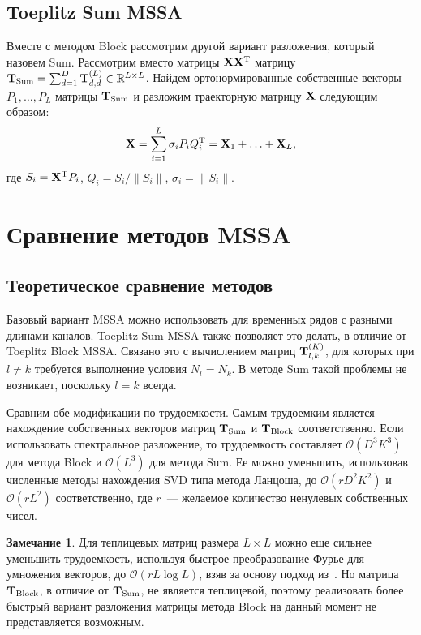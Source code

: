 \documentclass[specialist,
substylefile = spbu_report.rtx,
subf,href,colorlinks=true, 12pt]{disser}
\theoremstyle{definition}
\newtheorem{remark}{Замечание}
\newcommand{\R}{\mathbb{R}}
\begin{document}
\subsection{Toeplitz Sum MSSA}\label{sect:sum}
Вместе с методом Block рассмотрим другой вариант разложения, который назовем Sum. Рассмотрим вместо матрицы $\mathbf{X}\mathbf{X}^{\mathrm{T}}$ матрицу $\bfT_{\text{Sum}}=\sum_{d=1}^D \bfT_{d,d}^{(L)}\in\R^{L\times L}$. Найдем ортонормированные собственные векторы $P_1,\ldots,P_L$ матрицы $\mathbf{T}_{\text{Sum}}$ и разложим траекторную матрицу $\mathbf{X}$ следующим образом:
\begin{equation}\label{eq:sum_decomposition}
	\mathbf{X}=\sum_{i=1}^L\sigma_i P_iQ_i^{\mathrm{T}}=\mathbf{X}_1+\ldots+\mathbf{X}_L,
\end{equation}
где $S_i=\mathbf{X}^{\mathrm{T}} P_i$, $Q_i=S_i/\|S_i\|$, $\sigma_i=\|S_i\|$.

\section{Сравнение методов MSSA}\label{sect:mssa_comparison}
\subsection{Теоретическое сравнение методов}
Базовый вариант MSSA можно использовать для временных рядов с разными длинами каналов. Toeplitz Sum MSSA также позволяет это делать, в отличие от Toeplitz Block MSSA. Связано это с вычислением матриц $\mathbf{T}_{l,k}^{(K)}$, для которых при $l\ne k$ требуется выполнение условия $N_l=N_k$. В методе Sum такой проблемы не возникает, поскольку $l=k$ всегда.

Сравним обе модификации по трудоемкости. Самым трудоемким является нахождение собственных векторов матриц $\mathbf{T}_{\text{Sum}}$ и $\mathbf{T}_{\text{Block}}$ соответственно. Если использовать спектральное разложение, то трудоемкость составляет $\mathcal{O}(D^3K^3)$ для метода Block и $\mathcal{O}(L^3)$ для метода Sum. Ее можно уменьшить, использовав численные методы нахождения SVD типа метода Ланцоша, до $\mathcal{O}(rD^2K^2)$ и $\mathcal{O}(rL^2)$ соответственно, где $r$~--- желаемое количество ненулевых собственных чисел.
\begin{remark}\label{remark:mssa_complexity}
	Для теплицевых матриц размера $L\times L$ можно еще сильнее уменьшить трудоемкость, используя быстрое преобразование Фурье для умножения векторов, до $\mathcal{O}(r L\log L)$, взяв за основу подход из~\cite{Korobeynikov2010,Golyandina2015}. Но матрица $\mathbf{T}_{\text{Block}}$, в отличие от $\mathbf{T}_{\text{Sum}}$, не является теплицевой, поэтому реализовать более быстрый вариант разложения матрицы метода Block на данный момент не представляется возможным.
\end{remark}
\end{document}
